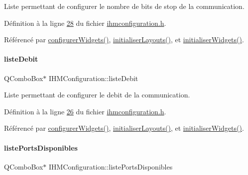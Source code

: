 Liste permettant de configurer le nombre de bits de stop de la communication. 



Définition à la ligne \hyperlink{ihmconfiguration_8h_source_l00028}{28} du fichier \hyperlink{ihmconfiguration_8h_source}{ihmconfiguration.\+h}.



Référencé par \hyperlink{ihmconfiguration_8cpp_source_l00033}{configurer\+Widgets()}, \hyperlink{ihmconfiguration_8cpp_source_l00051}{initialiser\+Layouts()}, et \hyperlink{ihmconfiguration_8cpp_source_l00023}{initialiser\+Widgets()}.

\mbox{\label{class_i_h_m_configuration_a98e8133a04509b3a80b232d2f031e81f}} 
\paragraph{\texorpdfstring{liste\+Debit}{listeDebit}}
{\footnotesize\ttfamily Q\+Combo\+Box$\ast$ I\+H\+M\+Configuration\+::liste\+Debit\hspace{0.3cm}{\ttfamily [private]}}



Liste permettant de configurer le debit de la communication. 



Définition à la ligne \hyperlink{ihmconfiguration_8h_source_l00026}{26} du fichier \hyperlink{ihmconfiguration_8h_source}{ihmconfiguration.\+h}.



Référencé par \hyperlink{ihmconfiguration_8cpp_source_l00033}{configurer\+Widgets()}, \hyperlink{ihmconfiguration_8cpp_source_l00051}{initialiser\+Layouts()}, et \hyperlink{ihmconfiguration_8cpp_source_l00023}{initialiser\+Widgets()}.

\mbox{\label{class_i_h_m_configuration_af3ce74444e24237aedf1d2ef2053b574}} 
\paragraph{\texorpdfstring{liste\+Ports\+Disponibles}{listePortsDisponibles}}
{\footnotesize\ttfamily Q\+Combo\+Box$\ast$ I\+H\+M\+Configuration\+::liste\+Ports\+Disponibles\hspace{0.3cm}{\ttfamily [private]}}




